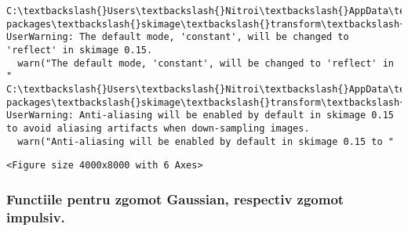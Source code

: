 \documentclass[11pt]{article}
\begin{document}
    \begin{Verbatim}[commandchars=\\\{\}]
C:\textbackslash{}Users\textbackslash{}Nitroi\textbackslash{}AppData\textbackslash{}Local\textbackslash{}Continuum\textbackslash{}anaconda3\textbackslash{}envs\textbackslash{}PAIC\textbackslash{}lib\textbackslash{}site-packages\textbackslash{}skimage\textbackslash{}transform\textbackslash{}\_warps.py:105: UserWarning: The default mode, 'constant', will be changed to 'reflect' in skimage 0.15.
  warn("The default mode, 'constant', will be changed to 'reflect' in "
C:\textbackslash{}Users\textbackslash{}Nitroi\textbackslash{}AppData\textbackslash{}Local\textbackslash{}Continuum\textbackslash{}anaconda3\textbackslash{}envs\textbackslash{}PAIC\textbackslash{}lib\textbackslash{}site-packages\textbackslash{}skimage\textbackslash{}transform\textbackslash{}\_warps.py:110: UserWarning: Anti-aliasing will be enabled by default in skimage 0.15 to avoid aliasing artifacts when down-sampling images.
  warn("Anti-aliasing will be enabled by default in skimage 0.15 to "

    \end{Verbatim}

    
    \begin{verbatim}
<Figure size 4000x8000 with 6 Axes>
    \end{verbatim}

    
    \subsubsection{Functiile pentru zgomot Gaussian, respectiv zgomot
impulsiv.}\label{functiile-pentru-zgomot-gaussian-respectiv-zgomot-impulsiv.}
\end{document}
